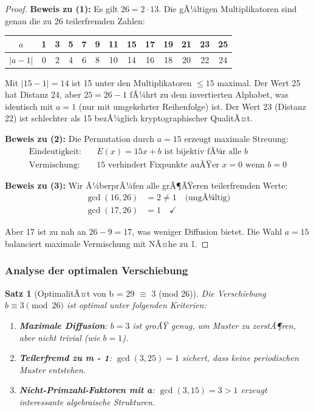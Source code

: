 ﻿\documentclass[12pt,a4paper]{article}
\newtheorem{theorem}{Satz}
\begin{document}
	\begin{proof}
		\textbf{Beweis zu (1):} 
		Es gilt $26 = 2 \cdot 13$. Die gÃ¼ltigen Multiplikatoren sind genau die zu 26 teilerfremden Zahlen:
		
		\begin{center}
			\begin{tabular}{|c|c|c|c|c|c|c|c|c|c|c|c|c|}
				\hline
				$a$ & 1 & 3 & 5 & 7 & 9 & 11 & 15 & 17 & 19 & 21 & 23 & 25 \\
				\hline
				$|a - 1|$ & 0 & 2 & 4 & 6 & 8 & 10 & 14 & 16 & 18 & 20 & 22 & 24 \\
				\hline
			\end{tabular}
		\end{center}
		
		Mit $|15 - 1| = 14$ ist 15 unter den Multiplikatoren $\leq 15$ maximal. Der Wert 25 hat 
		Distanz 24, aber $25 = 26 - 1$ fÃ¼hrt zu dem invertierten Alphabet, was identisch mit $a = 1$ 
		(nur mit umgekehrter Reihenfolge) ist. Der Wert 23 (Distanz 22) ist schlechter als 15 
		bezÃ¼glich kryptographischer QualitÃ¤t.
		
		\textbf{Beweis zu (2):}
		Die Permutation durch $a = 15$ erzeugt maximale Streuung:
		\begin{align}
			\text{Eindeutigkeit:} \quad & E(x) = 15x + b \text{ ist bijektiv fÃ¼r alle } b \\
			\text{Vermischung:} \quad & 15 \text{ verhindert Fixpunkte auÃŸer } x = 0 \text{ wenn } b = 0
		\end{align}
		
		\textbf{Beweis zu (3):}
		Wir Ã¼berprÃ¼fen alle grÃ¶ÃŸeren teilerfremden Werte:
		\begin{align}
			\gcd(16, 26) &= 2 \neq 1 \quad \text{(ungÃ¼ltig)} \\
			\gcd(17, 26) &= 1 \quad \checkmark
		\end{align}
		
		Aber 17 ist zu nah an $26 - 9 = 17$, was weniger Diffusion bietet. Die Wahl $a = 15$ balanciert maximale Vermischung mit NÃ¤he zu 1.
	\end{proof}
	
	\subsubsection{Analyse der optimalen Verschiebung}
	
	\begin{theorem}[OptimalitÃ¤t von b = 29 $\equiv$ 3 (mod 26)]
		Die Verschiebung $b \equiv 3 \pmod{26}$ ist optimal unter folgenden Kriterien:
		\begin{enumerate}
			\item \textbf{Maximale Diffusion}: $b = 3$ ist groÃŸ genug, um Muster zu zerstÃ¶ren, aber nicht trivial (wie $b = 1$).
			\item \textbf{Teilerfremd zu m - 1}: $\gcd(3, 25) = 1$ sichert, dass keine periodischen Muster entstehen.
			\item \textbf{Nicht-Primzahl-Faktoren mit a}: $\gcd(3, 15) = 3 > 1$ erzeugt interessante algebraische Strukturen.
		\end{enumerate}
	\end{theorem}
	
\end{document}
